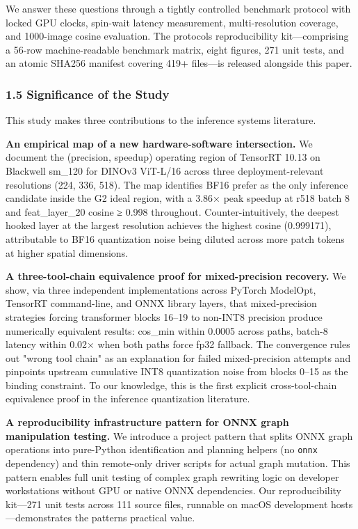 \documentclass[
]{article}
\begin{document}
We answer these questions through a tightly controlled benchmark
protocol with locked GPU clocks, spin-wait latency measurement,
multi-resolution coverage, and 1000-image cosine evaluation. The
protocol\textquotesingle s reproducibility kit---comprising a 56-row
machine-readable benchmark matrix, eight figures, 271 unit tests, and an
atomic SHA256 manifest covering 419+ files---is released alongside this
paper.

\subsubsection{1.5 Significance of the
Study}\label{15-significance-of-the-study}

This study makes three contributions to the inference systems
literature.

\textbf{An empirical map of a new hardware-software intersection.} We
document the (precision, speedup) operating region of TensorRT 10.13 on
Blackwell sm\_120 for DINOv3 ViT-L/16 across three deployment-relevant
resolutions (224, 336, 518). The map identifies BF16 prefer as the only
inference candidate inside the G2 ideal region, with a 3.86× peak
speedup at r518 batch 8 and feat\_layer\_20 cosine ≥ 0.998 throughout.
Counter-intuitively, the deepest hooked layer at the largest resolution
achieves the highest cosine (0.999171), attributable to BF16
quantization noise being diluted across more patch tokens at higher
spatial dimensions.

\textbf{A three-tool-chain equivalence proof for mixed-precision
recovery.} We show, via three independent implementations across PyTorch
ModelOpt, TensorRT command-line, and ONNX library layers, that
mixed-precision strategies forcing transformer blocks 16--19 to non-INT8
precision produce numerically equivalent results: cos\_min within 0.0005
across paths, batch-8 latency within 0.02× when both paths force fp32
fallback. The convergence rules out "wrong tool chain" as an explanation
for failed mixed-precision attempts and pinpoints upstream cumulative
INT8 quantization noise from blocks 0--15 as the binding constraint. To
our knowledge, this is the first explicit cross-tool-chain equivalence
proof in the inference quantization literature.

\textbf{A reproducibility infrastructure pattern for ONNX graph
manipulation testing.} We introduce a project pattern that splits ONNX
graph operations into pure-Python identification and planning helpers
(no \texttt{onnx} dependency) and thin remote-only driver scripts for
actual graph mutation. This pattern enables full unit testing of complex
graph rewriting logic on developer workstations without GPU or native
ONNX dependencies. Our reproducibility kit---271 unit tests across 111
source files, runnable on macOS development hosts---demonstrates the
pattern\textquotesingle s practical value.
\end{document}
